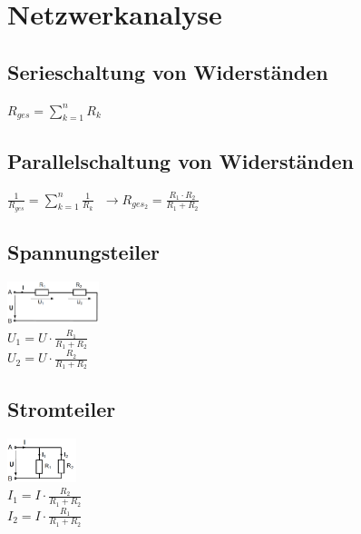 \section{Netzwerkanalyse}

\begin{multicols}{2}
\subsection{Serieschaltung von Widerständen}
$ R_{ges} = \sum\limits_{k=1}^{n}{R_k} $ \\

\subsection{Parallelschaltung von Widerständen}
$ \frac{1}{R_{ges}} = \sum\limits_{k=1}^{n}\frac{1}{R_k}\ \ \ \rightarrow R_{ges_2} = \frac{R_1 \cdot R_2}{R_1 + R_2} $ \\
\begin{multicols}{2}
\subsection{Spannungsteiler}
\includegraphics[width=0.20\textwidth]{pics/spannungsteiler}\\
$ U_1 = U \cdot \frac{R_1}{R_1 + R_2}$ \\
$ U_2 = U \cdot \frac{R_2}{R_1 + R_2}$ \\

\subsection{Stromteiler}
\includegraphics[width=0.15\textwidth]{pics/stromteiler}\\
$ I_1 = I \cdot \frac{R_2}{R_1 + R_2}$ \\
$ I_2 = I \cdot \frac{R_1}{R_1 + R_2}$ \\
\end{multicols}
\end{multicols}

